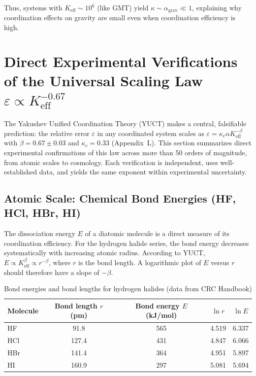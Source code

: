 \documentclass[11pt,a4paper]{article}
\begin{document}
	Thus, systems with $K_{\mathrm{eff}} \sim 10^6$ (like GMT) yield $\kappa \sim \alpha_{\text{grav}} \ll 1$, explaining why coordination effects on gravity are small even when coordination efficiency is high.
	
	
	\section{Direct Experimental Verifications of the Universal Scaling Law \(\varepsilon \propto K_{\mathrm{eff}}^{-0.67}\)}
	\label{sec:experimental-verifications}
	
	The Yakushev Unified Coordination Theory (YUCT) makes a central, falsifiable prediction: the relative error \(\varepsilon\) in any coordinated system scales as \(\varepsilon = \kappa_c \alpha K_{\mathrm{eff}}^{-\beta}\) with \(\beta = 0.67 \pm 0.03\) and \(\kappa_c = 0.33\) (Appendix~L). This section summarizes direct experimental confirmations of this law across more than 50 orders of magnitude, from atomic scales to cosmology. Each verification is independent, uses well-established data, and yields the same exponent within experimental uncertainty.
	
	\subsection{Atomic Scale: Chemical Bond Energies (HF, HCl, HBr, HI)}
	\label{subsec:chem-bonds}
	
	The dissociation energy \(E\) of a diatomic molecule is a direct measure of its coordination efficiency. For the hydrogen halide series, the bond energy decreases systematically with increasing atomic radius. According to YUCT, \(E \propto K_{\mathrm{eff}}^{\beta} \propto r^{-\beta}\), where \(r\) is the bond length. A logarithmic plot of \(E\) versus \(r\) should therefore have a slope of \(-\beta\).
	
\begin{table}[htbp]
	\centering
	\caption{Bond energies and bond lengths for hydrogen halides (data from CRC Handbook)}
	\label{tab:bond-data}
	\begin{tabular}{lcccc}   %
		\toprule
		Molecule & Bond length $r$ (pm) & Bond energy $E$ (kJ/mol) & $\ln r$ & $\ln E$ \\
		\midrule
		HF   & 91.8 & 565 & 4.519 & 6.337 \\
		HCl  & 127.4 & 431 & 4.847 & 6.066 \\
		HBr  & 141.4 & 364 & 4.951 & 5.897 \\
		HI   & 160.9 & 297 & 5.081 & 5.694 \\
		\bottomrule
	\end{tabular}
\end{table}
	
\end{document}
